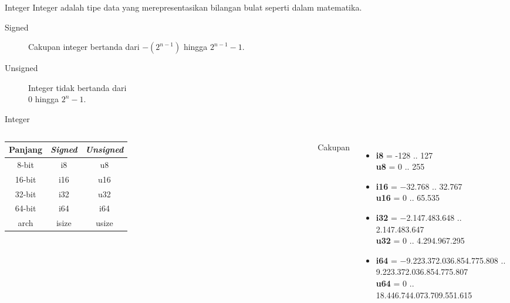 \documentclass[14pt]{beamer}
\begin{document}
\begin{frame}{Integer}
Integer adalah tipe data yang merepresentasikan bilangan bulat seperti dalam matematika.\\
\begin{description}
    \item[Signed] Cakupan integer bertanda dari $-\left ( 2^{n-1} \right )$ hingga $2^{n-1}-1$.\\
    \item[Unsigned] Integer tidak bertanda dari \\$0$ hingga $2^{n}-1$.
\end{description}

\end{frame}

\begin{frame}{Integer}
\begin{columns}[c]
    {\footnotesize
    \begin{tabular}{|c|c|c|}
        \hline
        \rowcolor{black!20}Panjang & \emph{Signed} & \emph{Unsigned}\\
        \hline
        8-bit & i8  & u8\\
        16-bit & i16 & u16\\ 
        32-bit & i32 & u32\\
        64-bit & i64 & i64\\
        arch & isize & usize\\
        \hline
    \end{tabular}
    }
    {\footnotesize
    Cakupan
    \begin{itemize}
        \item \textbf{i8} = -128 .. 127\\
        \textbf{u8} = 0 .. 255
        \item \textbf{i16} = −32.768 .. 32.767\\
        \textbf{u16} = 0 .. 65.535
        \item \textbf{i32} = −2.147.483.648 .. 2.147.483.647\\
        \textbf{u32} = 0 .. 4.294.967.295
        \item \textbf{i64} = −9.223.372.036.854.775.808 .. 9.223.372.036.854.775.807\\
        \textbf{u64} = 0 .. 18.446.744.073.709.551.615
    \end{itemize}
    }
\end{columns}
\end{frame}
\end{document}

